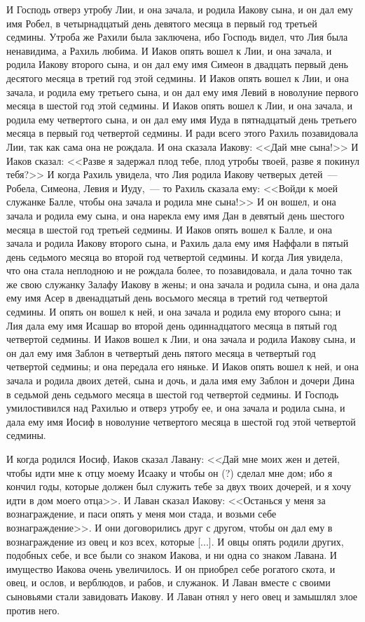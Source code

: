 И Господь отверз утробу Лии, и она зачала, и
родила Иакову сына, и он дал ему имя Робел, в
четырнадцатый день девятого месяца в первый год
третьей седмины. Утроба же Рахили была заключена,
ибо Господь видел, что Лия была ненавидима, а
Рахиль любима. И Иаков опять вошел к Лии, и она
зачала, и родила Иакову второго сына, и он дал ему
имя Симеон в двадцать первый день десятого
месяца в третий год этой седмины. И Иаков опять
вошел к Лии, и она зачала, и родила ему третьего
сына, и он дал ему имя Левий в новолуние первого
месяца в шестой год этой седмины. И Иаков опять
вошел к Лии, и она зачала, и родила ему четвертого
сына, и он дал ему имя Иуда в пятнадцатый день
третьего месяца в первый год четвертой седмины. И
ради всего этого Рахиль позавидовала Лии, так как
сама она не рождала. И она сказала Иакову: <<Дай
мне сына!>> И Иаков сказал: <<Разве я задержал
плод тебе, плод утробы твоей, разве я покинул
тебя?>> И когда Рахиль увидела, что Лия родила
Иакову четверых детей~--- Робела, Симеона, Левия и
Иуду,~--- то Рахиль сказала ему: <<Войди к моей
служанке Балле, чтобы она зачала и родила мне
сына!>> И он вошел, и она зачала и родила ему
сына, и она нарекла ему имя Дан в девятый день
шестого месяца в шестой год третьей седмины. И
Иаков опять вошел к Балле, и она зачала и родила
Иакову второго сына, и Рахиль дала ему имя
Наффали в пятый день седьмого месяца во второй
год четвертой седмины. И когда Лия увидела, что
она стала неплодною и не рождала более, то
позавидовала, и дала точно так же свою служанку
Залафу Иакову в жены; и она зачала и родила сына, и
она дала ему имя Асер в двенадцатый день восьмого
месяца в третий год четвертой седмины. И опять он
вошел к ней, и она зачала и родила ему второго
сына; и Лия дала ему имя Исашар во второй день
одиннадцатого месяца в пятый год четвертой
седмины. И Иаков вошел к Лии, и она зачала и родила
Иакову сына, и он дал ему имя Заблон в четвертый
день пятого месяца в четвертый год четвертой
седмины; и она передала его няньке. И Иаков опять
вошел к ней, и она зачала и родила двоих детей,
сына и дочь, и дала имя ему Заблон и дочери Дина в
седьмой день седьмого месяца в шестой год
четвертой седмины. И Господь умилостивился над
Рахилью и отверз утробу ее, и она зачала и родила
сына, и дала ему имя Иосиф в новолуние четвертого
месяца в шестой год этой четвертой седмины.

И когда родился Иосиф, Иаков сказал Лавану:
<<Дай мне моих жен и детей, чтобы идти мне к отцу
моему Исааку и чтобы он (?) сделал мне дом; ибо я
кончил годы, которые должен был служить тебе за
двух твоих дочерей, и я хочу идти в дом моего
отца>>. И Лаван сказал Иакову: <<Останься у
меня за вознаграждение, и паси опять у меня мои
стада, и возьми себе вознаграждение>>. И они
договорились друг с другом, чтобы он дал ему в
вознаграждение из овец и коз всех, которые [...]. И
овцы опять родили других, подобных себе, и все
были со знаком Иакова, и ни одна со знаком Лавана.
И имущество Иакова очень увеличилось. И он
приобрел себе рогатого скота, и овец, и ослов, и
верблюдов, и рабов, и служанок. И Лаван вместе с
своими сыновьями стали завидовать Иакову. И
Лаван отнял у него овец и замышлял злое против
него.


